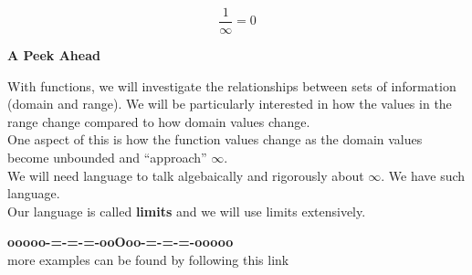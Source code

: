 \documentclass{ximera}
\begin{document}
\begin{question}


\[  \frac{1}{\infty} = 0 \]


\begin{multipleChoice}
\end{multipleChoice}


\end{question}












\item \textbf{\textcolor{purple!85!blue}{A Peek Ahead}} 


With functions, we will investigate the relationships between sets of information (domain and range).  We will be particularly interested in how the values in the range change compared to how domain values change. \\

One aspect of this is how the function values change as the domain values become unbounded and ``approach'' $\infty$. \\

We will need language to talk algebaically and rigorously about $\infty$. We have such language.  \\


Our language is called \textbf{limits} and we will use limits extensively.\\









\begin{center}
\textbf{\textcolor{green!50!black}{ooooo-=-=-=-ooOoo-=-=-=-ooooo}} \\

more examples can be found by following this link\\ 

\end{center}
\end{document}
